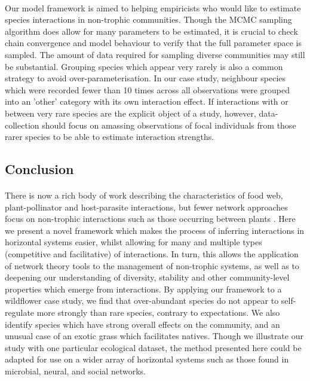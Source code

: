 \documentclass[a4,12pt]{article}
\begin{document}
        \paragraph{}
        Our model framework is aimed to helping empiricists who would like to estimate species interactions in non-trophic communities. Though the MCMC sampling algorithm does allow for many parameters to be estimated, it is crucial to check chain convergence and model behaviour to verify that the full parameter space is sampled. The amount of data required for sampling diverse communities may still be substantial. Grouping species which appear very rarely is also a common strategy to avoid over-parameterisation. In our case study, neighbour species which were recorded fewer than 10 times across all observations were grouped into an 'other' category with its own interaction effect. If interactions with or between very rare species are the explicit object of a study, however, data-collection should focus on amassing observations of focal individuals from those rarer species to be able to estimate  interaction strengths.   

\subsection{Conclusion}

    \paragraph{} 
    There is now a rich body of work describing the characteristics of food web, plant-pollinator and host-parasite interactions, but fewer network approaches focus on non-trophic interactions such as those occurring between plants \parencite{Ellison2019}. Here we present a novel framework which makes the process of inferring  interactions in horizontal systems easier, whilst allowing for many and multiple types (competitive and facilitative) of interactions. In turn, this allows the application of  network theory tools to the management of non-trophic systems, as well as to deepening our understanding of diversity, stability and other community-level properties which emerge from interactions. By applying our framework to a wildflower case study, we find that over-abundant species do not appear to self-regulate more strongly than rare species, contrary to expectations. We also identify species which have strong overall effects on the community, and an unusual case of an exotic grass which facilitates natives. Though we illustrate our study with one particular ecological dataset, the method presented here could be adapted for use on a wider array of  horizontal systems such as those found in microbial, neural, and social networks. 
   
\end{document}
